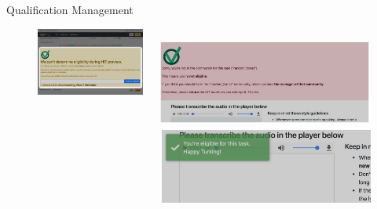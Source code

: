 \documentclass[../presentation]{subfiles}
\begin{document}
\begin{frame}{Qualification Management}
\begin{figure}
  \begin{columns}
  \begin{column}{0.45\textwidth}
  \includegraphics[width=\textwidth]{../common_figures/vitae/unknown.png}
  \end{column}
  \begin{column}{0.45\textwidth}
  \includegraphics[width=\textwidth]{../common_figures/vitae/rejected.png}
  \vspace{4mm}
  \includegraphics[width=\textwidth]{../common_figures/vitae/eligible.png}
  \end{column}
  \end{columns}
  \end{figure}
\end{frame}
\end{document}
